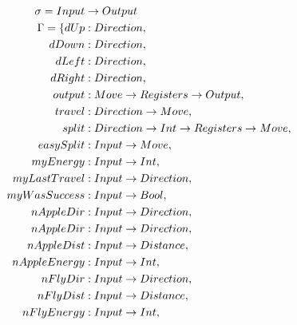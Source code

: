 \documentclass[12pt,a4paper]{report}
\begin{document}
\begin{align*}
\sigma = Input &\rightarrow Output\\
\Gamma = \{
dUp              &: Direction                                       ,\\              
dDown            &: Direction                                       ,\\              
dLeft            &: Direction                                       ,\\              
dRight           &: Direction                                       ,\\            
output           &: Move \rightarrow Registers \rightarrow Output                   ,\\            
travel           &: Direction \rightarrow Move                              ,\\          
split            &: Direction \rightarrow Int \rightarrow Registers \rightarrow Move        ,\\       
easySplit        &: Input \rightarrow Move                                  ,\\     
myEnergy         &: Input \rightarrow Int                                   ,\\     
myLastTravel     &: Input \rightarrow Direction                             ,\\                
myWasSuccess     &: Input \rightarrow Bool                                  ,\\      
nAppleDir        &: Input \rightarrow Direction                             ,\\          
nAppleDir        &: Input \rightarrow Direction                             ,\\                    
nAppleDist       &: Input \rightarrow Distance                              ,\\                   
nAppleEnergy     &: Input \rightarrow Int                                   ,\\              
nFlyDir          &: Input \rightarrow Direction                             ,\\                      
nFlyDist         &: Input \rightarrow Distance                              ,\\                    
nFlyEnergy       &: Input \rightarrow Int                                   ,\\              
\end{align*}
\end{document}
